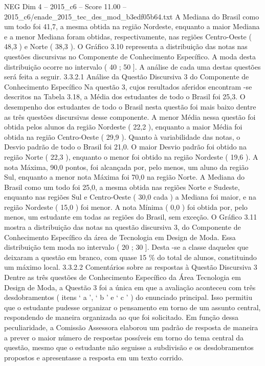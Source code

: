 \begin{textsample}{NEG Dim 4 – 2015\_c6 – Score 11.00 – 2015\_c6/enade\_2015\_tec\_des\_mod\_b3edf05b64.txt}
A Mediana do Brasil como um todo foi 41,7, a mesma obtida na região Nordeste, enquanto a maior Mediana e a menor Mediana foram obtidas, respectivamente, nas regiões Centro-Oeste ( 48,3 ) e Norte ( 38,3 ).
O Gráfico 3.10 representa a distribuição das notas nas questões discursivas no Componente de Conhecimento Específico.
A moda desta distribuição ocorre no intervalo ( 40 ; 50 ].
A análise de cada uma destas questões será feita a seguir. 3.3.2.1 Análise da Questão Discursiva 3 do Componente de Conhecimento Específico Na questão 3, cujos resultados aferidos encontram -se descritos na Tabela 3.18, a Média dos estudantes de todo o Brasil foi 25,3.
O desempenho dos estudantes de todo o Brasil nesta questão foi mais baixo dentre as três questões discursivas desse componente.
A menor Média nessa questão foi obtida pelos alunos da região Nordeste ( 22,2 ), enquanto a maior Média foi obtida na região Centro-Oeste ( 29,9 ).
Quanto à variabilidade das notas, o Desvio padrão de todo o Brasil foi 21,0.
O maior Desvio padrão foi obtido na região Norte ( 22,3 ), enquanto o menor foi obtido na região Nordeste ( 19,6 ).
A nota Máxima, 90,0 pontos, foi alcançada por, pelo menos, um aluno da região Sul, enquanto a menor nota Máxima foi 70,0 na região Norte.
A Mediana do Brasil como um todo foi 25,0, a mesma obtida nas regiões Norte e Sudeste, enquanto nas regiões Sul e Centro-Oeste ( 30,0 cada ) a Mediana foi maior, e na região Nordeste ( 15,0 ) foi menor.
A nota Mínima ( 0,0 ) foi obtida por, pelo menos, um estudante em todas as regiões do Brasil, sem exceção.
O Gráfico 3.11 mostra a distribuição das notas na questão discursiva 3, do Componente de Conhecimento Específico da área de Tecnologia em Design de Moda.
Essa distribuição tem moda no intervalo ( 20 ; 30 ].
Desta -se a classe daqueles que deixaram a questão em branco, com quase 15 \% do total de alunos, constituindo um máximo local. 3.3.2.2 Comentários sobre as respostas à Questão Discursiva 3 Dentre as três questões de Conhecimento Específico da Área Tecnologia em Design de Moda, a Questão 3 foi a única em que a avaliação aconteceu com três desdobramentos ( itens ‘ a ’, ‘ b ’ e ‘ c ’ ) do enunciado principal.
Isso permitiu que o estudante pudesse organizar o pensamento em torno de um assunto central, respondendo de maneira organizada ao que foi solicitado.
Em função dessa peculiaridade, a Comissão Assessora elaborou um padrão de resposta de maneira a prever o maior número de respostas possíveis em torno do tema central da questão, mesmo que o estudante não seguisse a subdivisão e os desdobramentos propostos e apresentasse a resposta em um texto corrido.

\end{textsample}
